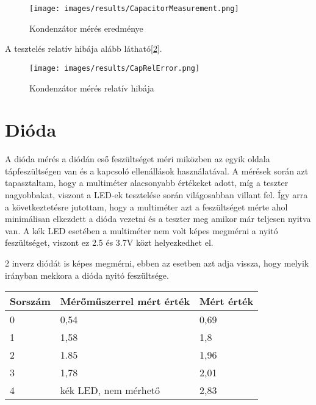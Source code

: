     \begin{figure}[H]
        \centering
        \texttt{[image: images/results/CapacitorMeasurement.png]}
        \caption{Kondenzátor mérés eredménye}
        \label{fig:CapacitorResults}
    \end{figure}

    A tesztelés relatív hibája alább látható[\ref{fig:CapRelErrorResults}].

    \begin{figure}[H]
        \centering
        \texttt{[image: images/results/CapRelError.png]}
        \caption{Kondenzátor mérés relatív hibája}
        \label{fig:CapRelErrorResults}
    \end{figure}

\section{Dióda}

A dióda mérés a diódán eső feszültséget méri miközben az egyik oldala
tápfeszültségen van és a kapcsoló ellenállások használatával.
A mérések során azt tapasztaltam, hogy a multiméter alacsonyabb
értékeket adott, míg a teszter nagyobbakat, viszont a LED-ek
tesztelése során világosabban villant fel. Így arra a következtetésre
jutottam, hogy a multiméter azt a feszültséget mérte ahol
minimálisan elkezdett a dióda vezetni és a teszter meg amikor
már teljesen nyitva van. A kék LED esetében a multiméter nem volt képes
megmérni a nyitó feszültséget, viszont ez 2.5 és 3.7V közt helyezkedhet el.

2 inverz diódát is képes megmérni, ebben az esetben azt adja vissza, hogy melyik
irányban mekkora a dióda nyitó feszültsége.

\begin{table}[H]
    \begin{tabular}{lll}
    Sorszám                 & Mérőműszerrel mért érték                  & Mért érték                \\ \hline
    \multicolumn{1}{|l|}{0} & \multicolumn{1}{l|}{0,54}                 & \multicolumn{1}{l|}{0,69} \\ \hline
    \multicolumn{1}{|l|}{1} & \multicolumn{1}{l|}{1,58}                 & \multicolumn{1}{l|}{1,8}  \\ \hline
    \multicolumn{1}{|l|}{2} & \multicolumn{1}{l|}{1.85}                 & \multicolumn{1}{l|}{1,96} \\ \hline
    \multicolumn{1}{|l|}{3} & \multicolumn{1}{l|}{1,78}                 & \multicolumn{1}{l|}{2,01} \\ \hline
    \multicolumn{1}{|l|}{4} & \multicolumn{1}{l|}{kék LED, nem mérhető} & \multicolumn{1}{l|}{2,83} \\ \hline
\end{tabular}
\end{table}

